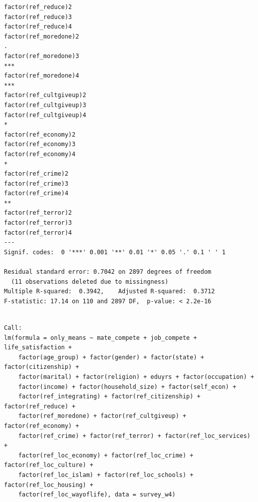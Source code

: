 \documentclass[
]{article}
\begin{document}
\begin{table}
\begin{minipage}[t]{\linewidth}
{\begin{verbatim}
factor(ref_reduce)2                                                                  
factor(ref_reduce)3                                                                  
factor(ref_reduce)4                                                                  
factor(ref_moredone)2                                                             .  
factor(ref_moredone)3                                                             ***
factor(ref_moredone)4                                                             ***
factor(ref_cultgiveup)2                                                              
factor(ref_cultgiveup)3                                                              
factor(ref_cultgiveup)4                                                           *  
factor(ref_economy)2                                                                 
factor(ref_economy)3                                                                 
factor(ref_economy)4                                                              *  
factor(ref_crime)2                                                                   
factor(ref_crime)3                                                                   
factor(ref_crime)4                                                                ** 
factor(ref_terror)2                                                                  
factor(ref_terror)3                                                                  
factor(ref_terror)4                                                                  
---
Signif. codes:  0 '***' 0.001 '**' 0.01 '*' 0.05 '.' 0.1 ' ' 1

Residual standard error: 0.7042 on 2897 degrees of freedom
  (11 observations deleted due to missingness)
Multiple R-squared:  0.3942,    Adjusted R-squared:  0.3712 
F-statistic: 17.14 on 110 and 2897 DF,  p-value: < 2.2e-16
\end{verbatim}

}

\end{minipage}%
\newline
\begin{minipage}[t]{\linewidth}

{\centering 

\begin{verbatim}

Call:
lm(formula = only_means ~ mate_compete + job_compete + life_satisfaction + 
    factor(age_group) + factor(gender) + factor(state) + factor(citizenship) + 
    factor(marital) + factor(religion) + eduyrs + factor(occupation) + 
    factor(income) + factor(household_size) + factor(self_econ) + 
    factor(ref_integrating) + factor(ref_citizenship) + factor(ref_reduce) + 
    factor(ref_moredone) + factor(ref_cultgiveup) + factor(ref_economy) + 
    factor(ref_crime) + factor(ref_terror) + factor(ref_loc_services) + 
    factor(ref_loc_economy) + factor(ref_loc_crime) + factor(ref_loc_culture) + 
    factor(ref_loc_islam) + factor(ref_loc_schools) + factor(ref_loc_housing) + 
    factor(ref_loc_wayoflife), data = survey_w4)


\end{verbatim}}
\end{minipage}
\end{table}
\end{document}
